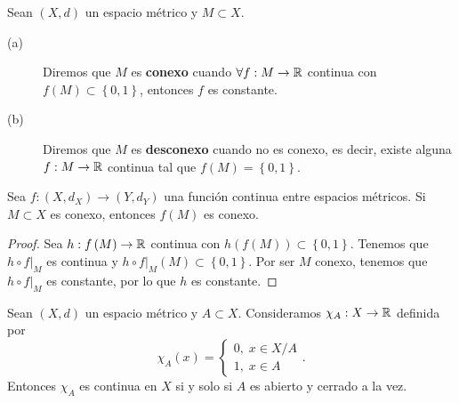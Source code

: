 \begin{definition}
Sean $\displaystyle \left(X,d\right) $ un espacio métrico y $\displaystyle M \subset X $. 
\begin{description}
	\item[(a)] Diremos que $\displaystyle M $ es \textbf{conexo} cuando $\displaystyle \forall f : M \to \mathbb{R} $ continua con $\displaystyle f\left(M\right) \subset \left\{ 0,1\right\}  $, entonces $\displaystyle f $ es constante. 
	\item[(b)] Diremos que $\displaystyle M $ es \textbf{desconexo} cuando no es conexo, es decir, existe alguna $\displaystyle f : M \to \mathbb{R} $ continua tal que $\displaystyle f\left(M\right) = \left\{ 0,1\right\}  $.
\end{description}
\end{definition}
\begin{theorem}
Sea $\displaystyle f : \left(X, d _{X}\right) \to \left(Y, d _{Y}\right) $ una función continua entre espacios métricos. Si $\displaystyle M \subset X $ es conexo, entonces $\displaystyle f\left(M\right) $ es conexo. 
\end{theorem}
\begin{proof}
	Sea $\displaystyle h : f\left(M\right) \to \mathbb{R} $ continua con $\displaystyle h\left(f\left(M\right)\right) \subset \left\{ 0,1\right\}  $. Tenemos que $\displaystyle h \circ f|_{M} $ es continua y $\displaystyle h \circ f|_{M}\left(M\right) \subset \left\{ 0,1\right\}  $. Por ser $\displaystyle M $ conexo, tenemos que $\displaystyle h \circ f|_{M} $ es constante, por lo que $\displaystyle h $ es constante. 
\end{proof}
\begin{lema}
Sean $\displaystyle \left(X,d \right) $ un espacio métrico y $\displaystyle A \subset X $. Consideramos $\displaystyle \chi_{A} : X \to \mathbb{R} $ definida por
\[\chi_{A}\left(x\right) = 
\begin{cases}
0, \; x \in X / A \\
1, \; x \in A
\end{cases}
.\]
Entonces $\displaystyle \chi_{A} $ es continua en $\displaystyle X $ si y solo si $\displaystyle A $ es abierto y cerrado a la vez. 
\end{lema}
